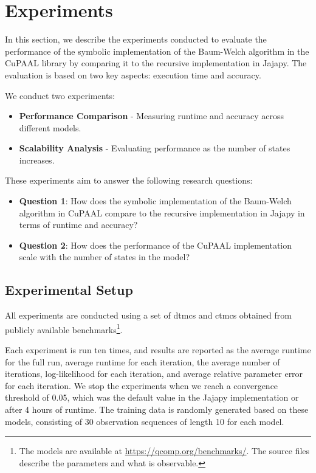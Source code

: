 \section{Experiments}
In this section, we describe the experiments conducted to evaluate the performance of the symbolic implementation of the Baum-Welch algorithm in the CuPAAL library by comparing it to the recursive implementation in Jajapy. The evaluation is based on two key aspects: execution time and accuracy.

We conduct two experiments:
\begin{itemize}
    \item \textbf{Performance Comparison} - Measuring runtime and accuracy across different models.
    \item \textbf{Scalability Analysis} - Evaluating performance as the number of states increases.
\end{itemize}

These experiments aim to answer the following research questions:
\begin{itemize}
    \item \textbf{Question 1}: How does the symbolic implementation of the Baum-Welch algorithm in CuPAAL compare to the recursive implementation in Jajapy in terms of runtime and accuracy?
    \item \textbf{Question 2}: How does the performance of the CuPAAL implementation scale with the number of states in the model?
\end{itemize}

\subsection{Experimental Setup}
All experiments are conducted using a set of \glspl{dtmc} and \glspl{ctmc} obtained from publicly available benchmarks\footnote{The models are available at \url{https://qcomp.org/benchmarks/}. The source files describe the parameters and what is observable.}.

Each experiment is run ten times, and results are reported as the average runtime for the full run, average runtime for each iteration,
the average number of iterations, log-likelihood for each iteration, and average relative parameter error for each iteration.
We stop the experiments when we reach a convergence threshold of 0.05, which was the default value in the Jajapy implementation or after
4 hours of runtime.
The training data is randomly generated based on these models, consisting of 30 observation sequences of length 10 for each model.

